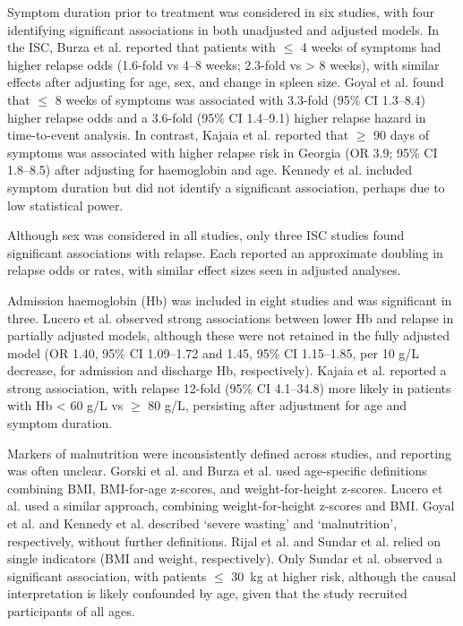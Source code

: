 Symptom duration prior to treatment was considered in six studies, with four identifying significant associations in both unadjusted and adjusted models\cite{burza2014, goyal2019, goyal2020, kajaia2011}. In the ISC, Burza et al. reported that patients with $\leq$ 4 weeks of symptoms had higher relapse odds (1.6-fold vs 4--8 weeks; 2.3-fold vs > 8 weeks), with similar effects after adjusting for age, sex, and change in spleen size\cite{burza2014}. Goyal et al. found that $\leq$ 8 weeks of symptoms was associated with 3.3-fold (95\% CI 1.3--8.4) higher relapse odds\cite{goyal2019} and a 3.6-fold (95\% CI 1.4--9.1) higher relapse hazard in time-to-event analysis\cite{goyal2020}. In contrast, Kajaia et al. reported that $\geq$ 90 days of symptoms was associated with higher relapse risk in Georgia (OR 3.9; 95\% CI 1.8--8.5) after adjusting for haemoglobin and age\cite{kajaia2011}. Kennedy et al. included symptom duration but did not identify a significant association, perhaps due to low statistical power\cite{kennedy2024}.

Although sex was considered in all studies, only three ISC studies found significant associations with relapse\cite{burza2014, ostyn2014, sundar2019}. Each reported an approximate doubling in relapse odds\cite{burza2014, sundar2019} or rates\cite{ostyn2014}, with similar effect sizes seen in adjusted analyses.

Admission haemoglobin (Hb) was included in eight studies\cite{burza2014, goyal2019, kajaia2011, kennedy2024, lucero2015, rijal2013, sundar2019} and was significant in three\cite{kajaia2011, kennedy2024, lucero2015}. Lucero et al. observed strong associations between lower Hb and relapse in partially adjusted models, although these were not retained in the fully adjusted model (OR 1.40, 95\% CI 1.09--1.72 and 1.45, 95\% CI 1.15--1.85, per 10 g/L decrease, for admission and discharge Hb, respectively). Kajaia et al. reported a strong association, with relapse 12-fold (95\% CI 4.1--34.8) more likely in patients with Hb < 60 g/L vs $\geq$ 80 g/L, persisting after adjustment for age and symptom duration.

Markers of malnutrition were inconsistently defined across studies, and reporting was often unclear. Gorski et al. and Burza et al. used age-specific definitions combining BMI, BMI-for-age z-scores, and weight-for-height z-scores\cite{gorski2010, burza2014}. Lucero et al. used a similar approach, combining weight-for-height z-scores and BMI\cite{lucero2015}. Goyal et al. and Kennedy et al. described `severe wasting' and `malnutrition', respectively, without further definitions\cite{goyal2019, kennedy2024}. Rijal et al. and Sundar et al. relied on single indicators (BMI and weight, respectively)\cite{rijal2013, sundar2019}. Only Sundar et al. observed a significant association, with patients $\leq$ 30~kg at higher risk, although the causal interpretation is likely confounded by age, given that the study recruited participants of all ages\cite{sundar2019}.

